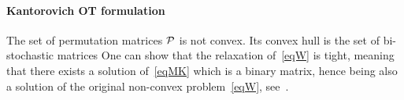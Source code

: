 
\paragraph{ Kantorovich OT formulation}

The set of permutation matrices $\mathcal{P}$ is not convex.  Its convex hull is the set of bi-stochastic matrices
One can show that the relaxation
of~\eqref{eqW} is tight, meaning that there exists a solution of~\eqref{eqMK} which is a binary matrix, hence being also a solution of the original non-convex problem~\eqref{eqW}, see~\cite{Villani03}.
